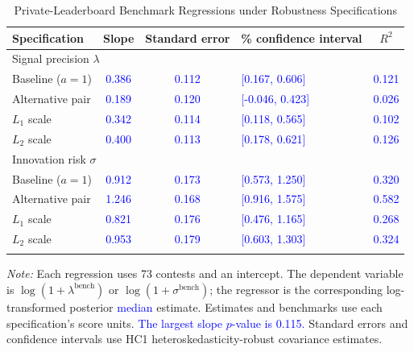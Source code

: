 \documentclass[mnsc]{informs3}
\begin{document}
\begin{APPENDICES}
\begin{table}[htbp]
\centering
\caption{{Private-Leaderboard Benchmark Regressions under Robustness Specifications}}
\label{tab-robustness-benchmarks}
{\small
\begin{tabularx}{\textwidth}{lcc>{\centering\arraybackslash}Xc}
\toprule
Specification & Slope & Standard error & 95\% confidence interval & $R^2$\\
\midrule
\multicolumn{5}{l}{Signal precision $\lambda$}\\
\midrule
Baseline ($a=1$) & \textcolor{blue}{0.386} & \textcolor{blue}{0.112} & \textcolor{blue}{[0.167, 0.606]} & \textcolor{blue}{0.121}\\
Alternative pair & \textcolor{blue}{0.189} & \textcolor{blue}{0.120} & \textcolor{blue}{[-0.046, 0.423]} & \textcolor{blue}{0.026}\\
$L_1$ scale & \textcolor{blue}{0.342} & \textcolor{blue}{0.114} & \textcolor{blue}{[0.118, 0.565]} & \textcolor{blue}{0.102}\\
$L_2$ scale & \textcolor{blue}{0.400} & \textcolor{blue}{0.113} & \textcolor{blue}{[0.178, 0.621]} & \textcolor{blue}{0.126}\\
\midrule
\multicolumn{5}{l}{Innovation risk $\sigma$}\\
\midrule
Baseline ($a=1$) & \textcolor{blue}{0.912} & \textcolor{blue}{0.173} & \textcolor{blue}{[0.573, 1.250]} & \textcolor{blue}{0.320}\\
Alternative pair & \textcolor{blue}{1.246} & \textcolor{blue}{0.168} & \textcolor{blue}{[0.916, 1.575]} & \textcolor{blue}{0.582}\\
$L_1$ scale & \textcolor{blue}{0.821} & \textcolor{blue}{0.176} & \textcolor{blue}{[0.476, 1.165]} & \textcolor{blue}{0.268}\\
$L_2$ scale & \textcolor{blue}{0.953} & \textcolor{blue}{0.179} & \textcolor{blue}{[0.603, 1.303]} & \textcolor{blue}{0.324}\\
\bottomrule
\addlinespace[0.5ex]
\end{tabularx}}
\begin{minipage}{\textwidth}
{\footnotesize\textit{Note:} Each regression uses 73 contests and an intercept. The dependent variable is $\log(1+\lambda^{\mathrm{bench}})$ or $\log(1+\sigma^{\mathrm{bench}})$; the regressor is the corresponding log-transformed posterior \textcolor{blue}{median} estimate. Estimates and benchmarks use each specification's score units. \textcolor{blue}{The largest slope $p$-value is 0.115.} Standard errors and confidence intervals use HC1 heteroskedasticity-robust covariance estimates.}
\end{minipage}
\end{table}


\end{APPENDICES}
\end{document}
